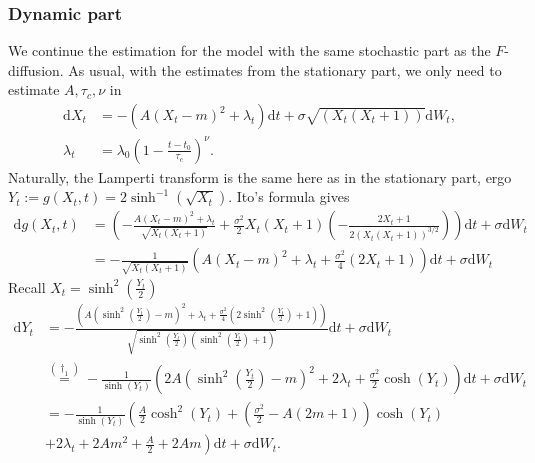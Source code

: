 \subsubsection{Dynamic part}
We continue the estimation for the model with the same stochastic part as the $F$-diffusion. As usual, with the estimates from the stationary part, we only need to estimate $A, \tau_c, \nu$ in
\begin{align}
    \mathrm{d}X_t &= -\left(A(X_t - m)^2 + \lambda_t\right)\mathrm{d}t + \sigma \sqrt{\left(X_t\left(X_t + 1\right)\right)}\mathrm{d}W_t,\\
    \lambda_t &= \lambda_0 \left(1 - \frac{t - t_0}{\tau_c}\right)^\nu.
\end{align}
Naturally, the Lamperti transform is the same here as in the stationary part, ergo $Y_t := g(X_t, t) = 2\sinh^{-1}\left(\sqrt{X_t}\right)$. Ito's formula gives 
\begin{align}
    \mathrm{d}g(X_t, t) &= \left(-\frac{A\left(X_t - m\right)^2 + \lambda_t}{\sqrt{X_t\left(X_t + 1\right)}}+ \frac{\sigma^2}{2}X_t\left(X_t + 1\right)\left(-\frac{2X_t + 1}{2\left(X_t\left(X_t + 1\right)\right)^{3/2}}\right)\right)\mathrm{d}t + \sigma\mathrm{d}W_t \nonumber \\
    &= -\frac{1}{\sqrt{X_t\left(X_t + 1\right)}}\left(A\left(X_t - m\right)^2 + \lambda_t + \frac{\sigma^2}{4}\left(2X_t + 1\right)\right)\mathrm{d}t + \sigma\mathrm{d}W_t
\end{align}
Recall $X_t = \sinh^2\left(\frac{Y_t}{2}\right)$
\begin{align}
    \mathrm{d}Y_t &= -\frac{\left(A\left(\sinh^2\left(\frac{Y_t}{2}\right) - m\right)^2 + \lambda_t + \frac{\sigma^2}{4}\left(2\sinh^2\left(\frac{Y_t}{2}\right) + 1\right)\right)}{\sqrt{\sinh^2\left(\frac{Y_t}{2}\right)\left(\sinh^2\left(\frac{Y_t}{2}\right) + 1\right)}}\mathrm{d}t + \sigma\mathrm{d}W_t 
    \nonumber\\ 
    &\overset{(\dagger_1)}{=} - \frac{1}{\sinh\left(Y_t\right)}\left(2A\left(\sinh^2\left(\frac{Y_t}{2}\right) - m\right)^2 + 2\lambda_t + \frac{\sigma^2}{2}\cosh(Y_t)\right)\mathrm{d}t + \sigma\mathrm{d}W_t \nonumber\\
    &=- \frac{1}{\sinh\left(Y_t\right)}\left(\frac{A}{2}\cosh^2\left(Y_t\right) + \left(\frac{\sigma^2}{2} - A \left(2m + 1\right)\right)\cosh\left(Y_t\right)\right. \nonumber \\ 
    &+\left. 2\lambda_t + 2Am^2 + \frac{A}{2} + 2Am\right)\mathrm{d}t + \sigma \mathrm{d}W_t. \label{eq:dynamicScaledFLamperti}
\end{align}

